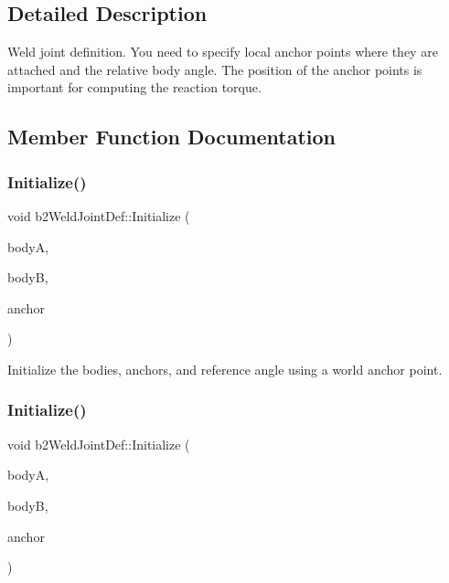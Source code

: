 \subsection{Detailed Description}
Weld joint definition. You need to specify local anchor points where they are attached and the relative body angle. The position of the anchor points is important for computing the reaction torque. 

\subsection{Member Function Documentation}
\mbox{\label{structb2WeldJointDef_a9f6592c2a7eba6ce6e07e40c4e82aab5}} 
\subsubsection{\texorpdfstring{Initialize()}{Initialize()}\hspace{0.1cm}{\footnotesize\ttfamily [1/2]}}
{\footnotesize\ttfamily void b2\+Weld\+Joint\+Def\+::\+Initialize (\begin{DoxyParamCaption}\item[{\hyperlink{classb2Body}{b2\+Body} $\ast$}]{bodyA,  }\item[{\hyperlink{classb2Body}{b2\+Body} $\ast$}]{bodyB,  }\item[{const \hyperlink{structb2Vec2}{b2\+Vec2} \&}]{anchor }\end{DoxyParamCaption})}

Initialize the bodies, anchors, and reference angle using a world anchor point. \mbox{\label{structb2WeldJointDef_a9f6592c2a7eba6ce6e07e40c4e82aab5}} 
\subsubsection{\texorpdfstring{Initialize()}{Initialize()}\hspace{0.1cm}{\footnotesize\ttfamily [2/2]}}
{\footnotesize\ttfamily void b2\+Weld\+Joint\+Def\+::\+Initialize (\begin{DoxyParamCaption}\item[{\hyperlink{classb2Body}{b2\+Body} $\ast$}]{bodyA,  }\item[{\hyperlink{classb2Body}{b2\+Body} $\ast$}]{bodyB,  }\item[{const \hyperlink{structb2Vec2}{b2\+Vec2} \&}]{anchor }\end{DoxyParamCaption})}

